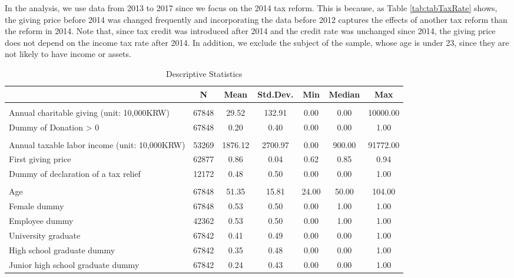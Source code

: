 \documentclass[
  11pt,
  a4paper,
]{article}
\begin{document}
In the analysis, we use data from 2013 to 2017 since we focus on the 2014 tax reform. This is because, as Table \ref{tab:tabTaxRate} shows, the giving price before 2014 was changed frequently and incorporating the data before 2012 captures the effects of another tax reform than the reform in 2014. Note that, since tax credit was introduced after 2014 and the credit rate was unchanged since 2014, the giving price does not depend on the income tax rate after 2014.
In addition, we exclude the subject of the sample, whose age is under 23, since they are not likely to have income or assets.

\begin{table}

\caption{\label{tab:SummaryCovariate}Descriptive Statistics}
\centering
\fontsize{9}{11}\selectfont
\begin{tabular}[t]{lcccccc}
\toprule
 & N & Mean & Std.Dev. & Min & Median & Max\\
\midrule
\addlinespace[0.3em]
\multicolumn{7}{l}{\textbf{Charitable Donations}}\\
\hspace{1em}Annual charitable giving (unit: 10,000KRW) & 67848 & 29.52 & 132.91 & 0.00 & 0.00 & 10000.00\\
\hspace{1em}Dummy of Donation > 0 & 67848 & 0.20 & 0.40 & 0.00 & 0.00 & 1.00\\
\addlinespace[0.3em]
\multicolumn{7}{l}{\textbf{Income, giving price, and tax report}}\\
\hspace{1em}Annual taxable labor income (unit: 10,000KRW) & 53269 & 1876.12 & 2700.97 & 0.00 & 900.00 & 91772.00\\
\hspace{1em}First giving price & 62877 & 0.86 & 0.04 & 0.62 & 0.85 & 0.94\\
\hspace{1em}Dummy of declaration of a tax relief & 12172 & 0.48 & 0.50 & 0.00 & 0.00 & 1.00\\
\addlinespace[0.3em]
\multicolumn{7}{l}{\textbf{Individual Characteristics}}\\
\hspace{1em}Age & 67848 & 51.35 & 15.81 & 24.00 & 50.00 & 104.00\\
\hspace{1em}Female dummy & 67848 & 0.53 & 0.50 & 0.00 & 1.00 & 1.00\\
\hspace{1em}Employee dummy & 42362 & 0.53 & 0.50 & 0.00 & 1.00 & 1.00\\
\hspace{1em}University graduate & 67842 & 0.41 & 0.49 & 0.00 & 0.00 & 1.00\\
\hspace{1em}High school graduate dummy & 67842 & 0.35 & 0.48 & 0.00 & 0.00 & 1.00\\
\hspace{1em}Junior high school graduate dummy & 67842 & 0.24 & 0.43 & 0.00 & 0.00 & 1.00\\
\bottomrule
\end{tabular}
\end{table}
\end{document}

